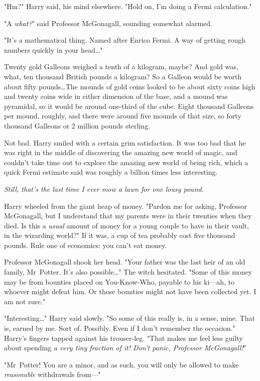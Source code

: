 "Hm?" Harry said, his mind elsewhere. "Hold on, I'm doing a Fermi calculation."

"A \emph{what?}" said Professor McGonagall, sounding somewhat alarmed.

"It's a mathematical thing. Named after Enrico Fermi. A way of getting rough
numbers quickly in your head…"

Twenty gold Galleons weighed a tenth of a kilogram, maybe? And gold was, what,
ten thousand British pounds a kilogram? So a Galleon would be worth about fifty
pounds…The mounds of gold coins looked to be about sixty coins high and
twenty coins wide in either dimension of the base, and a mound was pyramidal,
so it would be around one-third of the cube. Eight thousand Galleons per mound,
roughly, and there were around five mounds of that size, so forty thousand
Galleons or 2 million pounds sterling.

Not bad. Harry smiled with a certain grim satisfaction. It was too bad that he
was right in the middle of discovering the amazing new world of magic, and
couldn't take time out to explore the amazing new world of being rich, which a
quick Fermi estimate said was roughly a billion times less interesting.

\emph{Still, that's the last time I ever mow a lawn for one lousy pound.}

Harry wheeled from the giant heap of money. "Pardon me for asking, Professor
McGonagall, but I understand that my parents were in their twenties when they
died. Is this a \emph{usual} amount of money for a young couple to have in
their vault, in the wizarding world?" If it was, a cup of tea probably cost
five thousand pounds. Rule one of economics: you can't eat money.

Professor McGonagall shook her head. "Your father was the last heir of an old
family, Mr~Potter. It's also possible…" The witch hesitated. "Some of
this money may be from bounties placed on You-Know-Who, payable to his ki---ah,
to whoever might defeat him. Or those bounties might not have been collected
yet. I am not sure."

"Interesting…" Harry said slowly. "So some of this really is, in a
sense, mine. That is, earned by me. Sort of. Possibly. Even if I don't remember
the occasion." Harry's fingers tapped against his trouser-leg. "That makes me
feel less guilty about spending \emph{a very tiny fraction of it! Don't panic,
Professor McGonagall!}"

"Mr~Potter! You are a minor, and as such, you will only be allowed to make
\emph{reasonable} withdrawals from---"

